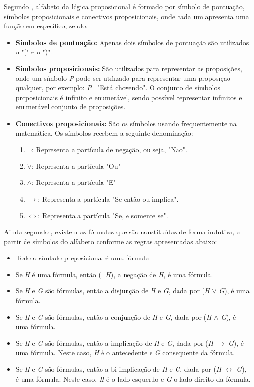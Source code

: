 Segundo \citeauthor{souza2017logica}, alfabeto da lógica proposicional é formado por símbolo de pontuação, símbolos proposicionais e conectivos proposicionais, onde cada um apresenta uma função em específico, sendo:
\begin{itemize}
\item \textbf{Símbolos de pontuação: }Apenas dois símbolos de pontuação são utilizados o "(" e o ")".
\item \textbf{Símbolos proposicionais:} São utilizados para representar as proposições, onde um símbolo \textit{P} pode ser utilizado para representar uma proposição qualquer, por exemplo: \textit{P}="Está chovendo". O conjunto de símbolos proposicionais é infinito e enumerável, sendo possível representar infinitos e enumerável conjunto de proposições.
\item \textbf{Conectivos proposicionais:} São os símbolos usando frequentemente na matemática. Os símbolos recebem a seguinte denominação: 
\begin{enumerate}
\item \textbf{$\neg$}: Representa a partícula de negação, ou seja, "Não".
\item \textbf{$\lor$}: Representa a partícula "Ou"
\item \textbf{$\land$}: Representa a partícula "E"
\item \textbf{$\rightarrow$}: Representa a partícula "Se então ou implica".
\item \textbf{$\Leftrightarrow$}: Representa a partícula "Se, e somente se".
\end{enumerate} 
\end{itemize}

Ainda segundo \citeauthor{souza2017logica}, existem as fórmulas que são constituídas de forma indutiva, a partir de símbolos do alfabeto conforme as regras apresentadas abaixo:
\begin{itemize}
\item Todo o símbolo preposicional é uma fórmula
\item Se \textit{H} é uma fórmula, então ($\neg$\textit{H}), a negação de \textit{H}, é uma fórmula.
\item Se \textit{H} e \textit{G} são fórmulas, então a disjunção de \textit{H} e \textit{G}, dada por (\textit{H} $\lor$ \textit{G}), é uma fórmula.
\item Se \textit{H} e \textit{G} são fórmulas, então a conjunção de \textit{H} e \textit{G}, dada por (\textit{H} $\land$ \textit{G}), é uma fórmula.
\item Se \textit{H} e \textit{G} são fórmulas, então a implicação de \textit{H} e \textit{G}, dada por (\textit{H} $\rightarrow$ \textit{G}), é uma fórmula. Neste caso, \textit{H} é o antecedente e \textit{G} consequente da fórmula.
\item Se \textit{H} e \textit{G} são fórmulas, então a bi-implicação de \textit{H} e \textit{G}, dada por (\textit{H} $\leftrightarrow$ \textit{G}), é uma fórmula. Neste caso, \textit{H} é o lado esquerdo e \textit{G} o lado direito da fórmula.
\end{itemize}


